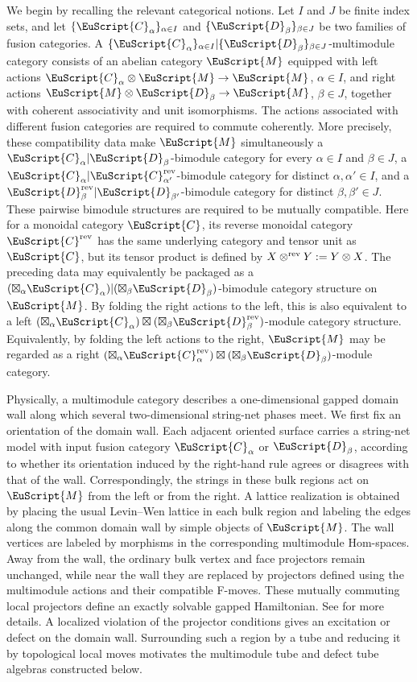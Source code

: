 \documentclass[a4paper,11pt]{article}
\theoremstyle{definition}
\theoremstyle{remark}
\newcommand\eC           {\EuScript{C}}
\newcommand\eD           {\EuScript{D}}
\newcommand\eM          {\EuScript{M}}
\begin{document}
We begin by recalling the relevant categorical notions. Let $I$ and $J$ be finite index sets, and let $\{\eC_\alpha\}_{\alpha\in I}$ and $\{\eD_\beta\}_{\beta\in J}$ be two families of fusion categories. A $\{\eC_\alpha\}_{\alpha\in I}|\{\eD_\beta\}_{\beta\in J}$-multimodule category consists of an abelian category $\eM$ equipped with left actions $\eC_\alpha\otimes\eM\to\eM$, $\alpha\in I$, and right actions $\eM\otimes\eD_\beta\to\eM$, $\beta\in J$, together with coherent associativity and unit isomorphisms. The actions associated with different fusion categories are required to commute coherently. More precisely, these compatibility data make $\eM$ simultaneously a $\eC_\alpha|\eD_\beta$-bimodule category for every $\alpha\in I$ and $\beta\in J$, a $\eC_\alpha|\eC_{\alpha'}^{\rm rev}$-bimodule category for distinct $\alpha,\alpha'\in I$, and a $\eD_\beta^{\rm rev}|\eD_{\beta'}$-bimodule category for distinct $\beta,\beta'\in J$. These pairwise bimodule structures are required to be mutually compatible. Here for a monoidal category $\eC$, its reverse monoidal category $\eC^{\rm rev}$ has the same underlying category and tensor unit as $\eC$, but its tensor product is defined by $X\otimes^{\rm rev}Y:=Y\otimes X$. The preceding data may equivalently be packaged as a $(\boxtimes _\alpha \eC_\alpha)|(\boxtimes_\beta\eD_\beta)$-bimodule category structure on $\eM$. By folding the right actions to the left, this is also equivalent to a left $(\boxtimes _\alpha \eC_\alpha)\boxtimes(\boxtimes_\beta\eD_\beta^{\rm rev})$-module category structure. Equivalently, by folding the left actions to the right, $\eM$ may be regarded as a right $(\boxtimes _\alpha \eC_\alpha^{\rm rev})\boxtimes(\boxtimes_\beta\eD_\beta)$-module category.


Physically, a multimodule category describes a one-dimensional gapped domain wall
along which several two-dimensional string-net phases meet. We first fix an orientation of the domain wall. Each adjacent oriented surface carries a string-net model with input fusion category $\eC_\alpha$ or $\eD_\beta$, according to whether its orientation induced by the right-hand rule agrees or disagrees with that of the wall. Correspondingly, the strings in these bulk regions act on $\eM$ from the left or from the right.
A lattice realization is obtained by placing the usual Levin--Wen lattice in each bulk region and labeling the edges along the common domain wall by simple objects of $\eM$. The wall vertices are labeled by morphisms in the corresponding
multimodule Hom-spaces. Away from the wall, the ordinary bulk vertex and face
projectors remain unchanged, while near the wall they are replaced by projectors defined using the multimodule actions and their compatible F-moves. These mutually commuting local projectors define an exactly solvable gapped Hamiltonian. See \cite[Section~3.2]{jia2025tube} for more details. A localized violation of the projector conditions gives an excitation or defect on the domain wall. Surrounding such a region by a tube and reducing it by topological local moves motivates the multimodule tube and defect tube algebras constructed below.
\end{document}
